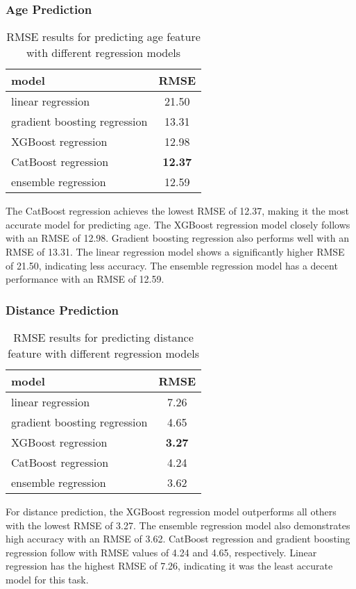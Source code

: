 \subsubsection*{Age Prediction} 
\FloatBarrier
\begin{table}[htbp]
\centering
\begin{tabular}{@{}lc@{}}
\toprule
model & RMSE\\ \midrule
linear regression & 21.50 \\
gradient boosting regression & 13.31 \\
XGBoost regression & 12.98 \\
CatBoost regression & \textbf{12.37} \\
ensemble regression & 12.59 \\ \bottomrule
\end{tabular}
\caption{RMSE results for predicting age feature with different regression models}
\end{table}
\FloatBarrier

The CatBoost regression achieves the lowest RMSE of 12.37, making it the most accurate model for predicting age. The XGBoost regression model closely follows with an RMSE of 12.98. Gradient boosting regression also performs well with an RMSE of 13.31. The linear regression model shows a significantly higher RMSE of 21.50, indicating less accuracy. The ensemble regression model has a decent performance with an RMSE of 12.59.

\newpage
\subsubsection*{Distance Prediction}
\FloatBarrier
\begin{table}[htbp]
\centering
\begin{tabular}{@{}lc@{}}
\toprule
model & RMSE \\ \midrule
linear regression & 7.26 \\
gradient boosting regression & 4.65 \\
XGBoost regression & \textbf{3.27} \\
CatBoost regression & 4.24 \\
ensemble regression & 3.62 \\ \bottomrule
\end{tabular}
\caption{RMSE results for predicting distance feature with different regression models}
\end{table}
\FloatBarrier

For distance prediction, the XGBoost regression model outperforms all others with the lowest RMSE of 3.27. The ensemble regression model also demonstrates high accuracy with an RMSE of 3.62. CatBoost regression and gradient boosting regression follow with RMSE values of 4.24 and 4.65, respectively. Linear regression has the highest RMSE of 7.26, indicating it was the least accurate model for this task.

